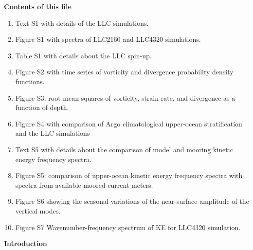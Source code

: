 \documentclass[draft,grl]{agutexSI}
\begin{document}
%
%

%

\begin{article}

%
%



\noindent\textbf{Contents of this file}
\begin{enumerate}
\item Text S1 with details of the LLC simulations.
\item Figure S1 with spectra of LLC2160 and LLC4320 simulations.
\item Table S1 with details about the LLC spin-up.
\item Figure S2 with time series of vorticity and divergence probability density
      functions.
\item Figure S3: root-mean-squares of vorticity, strain rate, and divergence
      as a function of depth.
\item Figure S4 with comparison of Argo climatological upper-ocean stratification
      and the LLC simulations
\item Text S5 with details about the comparison of model and mooring kinetic energy
            frequency spectra.
\item Figure S5: comparison of upper-ocean kinetic energy
      frequency spectra with spectra from available moored current meters.
\item Figure S6 showing the seasonal variations of the near-surface amplitude
      of the vertical modes.
\item Figure S7 Wavenumber-frequency spectrum of KE for LLC4320 simulation.
\end{enumerate}


\noindent\textbf{Introduction}


\end{article}
\end{document}
